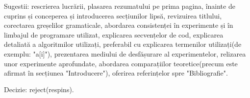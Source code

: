\documentclass[]{article}
\begin{document}
Sugestii: rescrierea lucrării, plasarea rezumatului pe prima pagina, înainte de cuprins și conceperea și introducerea secțiunilor lipsă, revizuirea titlului, corectarea greșelilor gramaticale, abordarea consistenței în experimente și în limbajul de programare utilizat, explicarea secvențelor de cod, explicarea detaliată a algoritmilor utilizați, preferabil cu explicarea termenilor utilizați(de exemplu: "a[i]"), prezentarea mediului de desfășurare al experimentelor, relizarea unor experimente aprofundate, abordarea comparațiilor teoretice(precum este afirmat în secțiunea "Introducere"), oferirea referințelor spre "Bibliografie".

Decizie: reject(respins).
\end{document}
